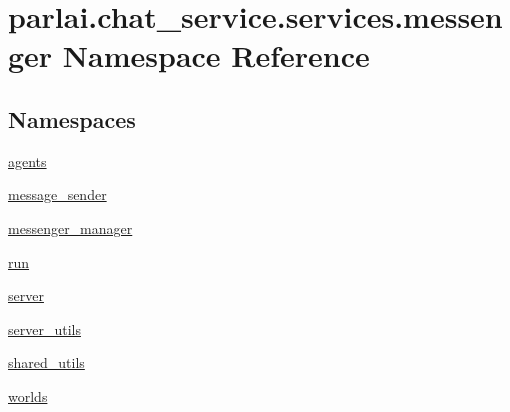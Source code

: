 \hypertarget{namespaceparlai_1_1chat__service_1_1services_1_1messenger}{}\section{parlai.\+chat\+\_\+service.\+services.\+messenger Namespace Reference}
\label{namespaceparlai_1_1chat__service_1_1services_1_1messenger}
\subsection*{Namespaces}
\begin{DoxyCompactItemize}
\item 
 \hyperlink{namespaceparlai_1_1chat__service_1_1services_1_1messenger_1_1agents}{agents}
\item 
 \hyperlink{namespaceparlai_1_1chat__service_1_1services_1_1messenger_1_1message__sender}{message\+\_\+sender}
\item 
 \hyperlink{namespaceparlai_1_1chat__service_1_1services_1_1messenger_1_1messenger__manager}{messenger\+\_\+manager}
\item 
 \hyperlink{namespaceparlai_1_1chat__service_1_1services_1_1messenger_1_1run}{run}
\item 
 \hyperlink{namespaceparlai_1_1chat__service_1_1services_1_1messenger_1_1server}{server}
\item 
 \hyperlink{namespaceparlai_1_1chat__service_1_1services_1_1messenger_1_1server__utils}{server\+\_\+utils}
\item 
 \hyperlink{namespaceparlai_1_1chat__service_1_1services_1_1messenger_1_1shared__utils}{shared\+\_\+utils}
\item 
 \hyperlink{namespaceparlai_1_1chat__service_1_1services_1_1messenger_1_1worlds}{worlds}
\end{DoxyCompactItemize}
